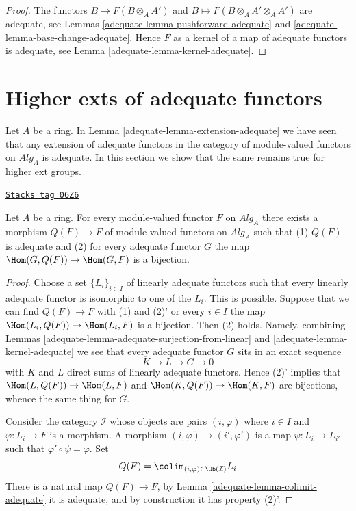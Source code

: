 \begin{proof}

The functors $B \to F(B \otimes_A A')$ and
$B \mapsto F(B \otimes_A A' \otimes_A A')$ are adequate, see
Lemmas \ref{adequate-lemma-pushforward-adequate} and
\ref{adequate-lemma-base-change-adequate}.
Hence $F$ as a kernel of a map of adequate functors is adequate, see
Lemma \ref{adequate-lemma-kernel-adequate}.
\end{proof}

\section{Higher exts of adequate functors}
\label{adequate-section-higher-ext}
Let $A$ be a ring. In
Lemma \ref{adequate-lemma-extension-adequate}
we have seen that any extension of adequate functors in the category
of module-valued functors on $\textit{Alg}_A$ is adequate. In this
section we show that the same remains true for higher ext groups.

\begin{lemma}[Adjoint]
\label{adequate-lemma-adjoint}
\href{https://stacks.math.columbia.edu/tag/06Z6}{\texttt{Stacks tag 06Z6}}

Let $A$ be a ring.
For every module-valued functor $F$ on $\textit{Alg}_A$
there exists a morphism $Q(F) \to F$ of module-valued functors on
$\textit{Alg}_A$ such that (1) $Q(F)$ is adequate and (2) for every
adequate functor $G$ the map $\Hom(G, Q(F)) \to \Hom(G, F)$
is a bijection.
\end{lemma}

\begin{proof}

Choose a set $\{L_i\}_{i \in I}$ of linearly adequate functors such that
every linearly adequate functor is isomorphic to one of the $L_i$.
This is possible. Suppose that we can find $Q(F) \to F$ with (1) and
(2)' or every $i \in I$ the map $\Hom(L_i, Q(F)) \to \Hom(L_i, F)$
is a bijection. Then (2) holds. Namely, combining
Lemmas \ref{adequate-lemma-adequate-surjection-from-linear} and
\ref{adequate-lemma-kernel-adequate}
we see that every adequate functor $G$ sits in an exact sequence
$$
K \to L \to G \to 0
$$
with $K$ and $L$ direct sums of linearly adequate functors. Hence (2)'
implies that
$\Hom(L, Q(F)) \to \Hom(L, F)$
and
$\Hom(K, Q(F)) \to \Hom(K, F)$
are bijections, whence the same thing for $G$.

\medskip\noindent
Consider the category $\mathcal{I}$ whose objects are pairs
$(i, \varphi)$ where $i \in I$ and $\varphi : L_i \to F$ is a morphism.
A morphism $(i, \varphi) \to (i', \varphi')$ is a map
$\psi : L_i \to L_{i'}$ such that $\varphi' \circ \psi = \varphi$.
Set
$$
Q(F) = \colim_{(i, \varphi) \in \Ob(\mathcal{I})} L_i
$$
There is a natural map $Q(F) \to F$, by
Lemma \ref{adequate-lemma-colimit-adequate}
it is adequate, and by construction it has property (2)'.
\end{proof}

